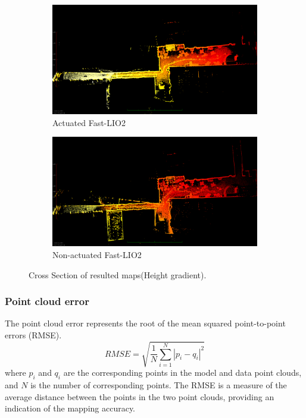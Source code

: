 \documentclass[conference]{IEEEtran}
\begin{document}
\begin{figure}[t]
\begin{subfigure}{0.48\columnwidth}
        \centering
        \includegraphics[width=\textwidth]{pics/eagle_view/act_lio_top.png}
        \caption{Actuated Fast-LIO2}
        \label{fig:act_fast_lio_top}\end{subfigure}
\hfill
\begin{subfigure}{0.48\columnwidth}
        \centering
        \includegraphics[width=\textwidth]{pics/eagle_view/non_lio_top.png}
        \caption{Non-actuated Fast-LIO2}
        \label{fig:non_act_fast_lio_top}
\end{subfigure}

\caption{Cross Section of resulted maps(Height gradient).}

\end{figure}

\subsubsection{Point cloud error}
The point cloud error represents the root of the mean squared point-to-point errors (RMSE).
\begin{equation}
    RMSE = \sqrt{\frac{1}{N} \sum_{i=1}^{N} |p_i - q_i|^2}
\end{equation}
where \( p_i \) and \( q_i \) are the corresponding points in the model and data point clouds, and \( N\) is the number of corresponding points. 
The RMSE is a measure of the average distance between the points in the two point clouds, providing an indication of the mapping accuracy.
\end{document}
